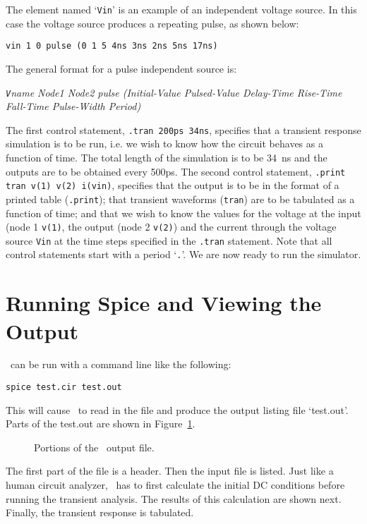 The element named `{\tt Vin}' is an example of an independent voltage source.
In this case the voltage source produces a repeating pulse, as shown below:
\par\noindent
\par\noindent
\centerline{}
\par\noindent
{\tt vin 1 0 pulse (0 1 5 4ns 3ns 2ns 5ns 17ns)}
\vspace{5mm}
\par\noindent
The general format for a pulse independent source is:
\vspace{5mm}
\par\noindent
{\it {\tt V}name Node1 Node2 pulse (Initial-Value Pulsed-Value Delay-Time
Rise-Time  Fall-Time Pulse-Width Period)}
\vspace{5mm}
\par\noindent
The first control statement, {\tt .tran 200ps 34ns}, specifies that a 
transient response simulation is to be run, i.e. we wish to know how
the circuit behaves as a function of time.   The total length of
the simulation is to be 34~ns and the outputs are to be obtained
every 500ps.  The second control statement, {\tt .print tran v(1) v(2) i(vin)},
specifies that the output is to be in the format of a printed table
({\tt .print});
that transient waveforms ({\tt tran}) are to be tabulated
as a function of time; and that we wish to know the values for the voltage
at the input (node 1 {\tt v(1)}, the output (node 2 {\tt v(2)}) and the
current through the voltage source {\tt Vin}
at the time steps specified in the {\tt .tran} statement.
Note that all control statements start with a period `{\tt .}'.
We are now ready to run the simulator.

\section{Running Spice and Viewing the Output}

\spice\  can be run with a command line like the following:
\begin{center}
{\tt spice test.cir test.out}
\end{center}
\par\noindent
This will cause \spice\ to read in the file and produce the output listing
file `test.out'.  Parts of the test.out are shown in Figure~\ref{out}.
%
\begin{figure}
\centerline{\epsfysize=15cm}
\caption{Portions of the \spice\ output file.}
\label{out}
\end{figure}
%
The first part of the file is a header.  Then the input file
is listed.  Just like a human circuit analyzer, \spice\ has to first 
calculate the initial DC conditions before running the transient analysis.
The results of this calculation are shown next.  Finally, the transient
response is tabulated.

